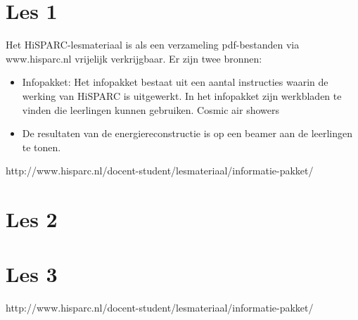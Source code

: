 \section{Les 1}

Het HiSPARC-lesmateriaal is als een verzameling pdf-bestanden via www.hisparc.nl vrijelijk verkrijgbaar. Er zijn twee bronnen:

\begin{itemize}
\item Infopakket: Het infopakket bestaat uit een aantal instructies waarin de werking van HiSPARC is uitgewerkt. In het infopakket zijn werkbladen te vinden die leerlingen kunnen gebruiken. Cosmic air showers
\item De resultaten van de energiereconstructie is op een beamer aan de leerlingen te tonen.
\end{itemize}

http://www.hisparc.nl/docent-student/lesmateriaal/informatie-pakket/

\section{Les 2}


\section{Les 3}
http://www.hisparc.nl/docent-student/lesmateriaal/informatie-pakket/


